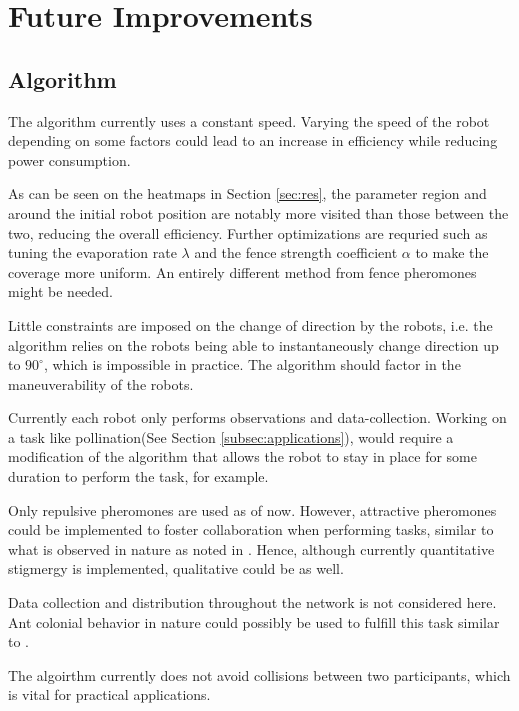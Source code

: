 \section{Future Improvements} 
\subsection{Algorithm}
The algorithm currently uses a constant speed. Varying the speed of the robot depending on some factors could lead to an increase in efficiency while reducing power consumption. 
\par As can be seen on the heatmaps in Section \ref{sec:res}, the parameter region and around the initial robot position are notably more visited than those between the two, reducing the overall efficiency. Further optimizations are requried such as tuning the evaporation rate $\lambda$ and the fence strength coefficient $\alpha$ to make the coverage more uniform. An entirely different method from fence pheromones might be needed. 
\par Little constraints are imposed on the change of direction by the robots, i.e. the algorithm relies on the robots being able to instantaneously change direction up to $90^{\circ}$, which is impossible in practice. The algorithm should factor in the maneuverability of the robots.
\par Currently each robot only performs observations and data-collection. Working on a task like pollination(See Section \ref{subsec:applications}), would require a modification of the algorithm that allows the robot to stay in place for some duration to perform the task, for example.
\par Only repulsive pheromones are used as of now. However, attractive pheromones could be implemented to foster collaboration when performing tasks, similar to what is observed in nature as noted in \parencite{david_morgan_trail_2009}. Hence, although currently quantitative stigmergy is implemented, qualitative could be as well.
\par Data collection and distribution throughout the network is not considered here. Ant colonial behavior in nature could possibly be used to fulfill this task similar to \parencite{adler_information_1992}.
\par The algoirthm currently does not avoid collisions between two participants, which is vital for practical applications.
